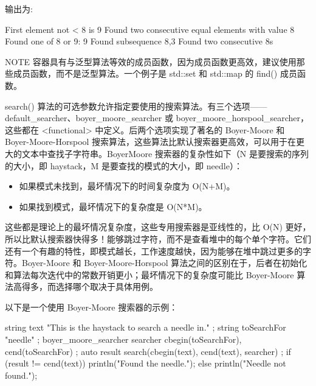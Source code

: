 输出为:

\begin{shell}
First element not < 8 is 9
Found two consecutive equal elements with value 8
Found one of 8 or 9: 9
Found subsequence {8,3}
Found two consecutive 8s
\end{shell}

\begin{myNotic}{NOTE}
容器具有与泛型算法等效的成员函数，因为成员函数更高效，建议使用那些成员函数，而不是泛型算法。一个例子是 std::set 和 std::map 的 find() 成员函数。
\end{myNotic}


search() 算法的可选参数允许指定要使用的搜索算法。有三个选项——default\_searcher、boyer\_moore\_searcher 或 boyer\_moore\_horspool\_searcher，这些都在 <functional> 中定义。后两个选项实现了著名的 Boyer-Moore 和 Boyer-Moore-Horspool 搜索算法，这些算法比默认搜索器更高效，可以用于在更大的文本中查找子字符串。BoyerMoore 搜索器的复杂性如下（N 是要搜索的序列的大小，即 haystack，M 是要查找的模式的大小，即 needle）：

\begin{itemize}
\item
如果模式未找到，最坏情况下的时间复杂度为 O(N+M)。

\item
如果找到模式，最坏情况下的复杂度是 O(N*M)。
\end{itemize}

这些都是理论上的最坏情况复杂度，这些专用搜索器是亚线性的，比 O(N) 更好，所以比默认搜索器快得多！能够跳过字符，而不是查看堆中的每个单个字符。它们还有一个有趣的特性，即模式越长，工作速度越快，因为能够在堆中跳过更多的字符。Boyer-Moore 和 Boyer-Moore-Horspool 算法之间的区别在于，后者在初始化和算法每次迭代中的常数开销更小；最坏情况下的复杂度可能比 Boyer-Moore 算法高得多，而选择哪个取决于具体用例。

以下是一个使用 Boyer-Moore 搜索器的示例：

\begin{cpp}
string text { "This is the haystack to search a needle in." };
string toSearchFor { "needle" };
boyer_moore_searcher searcher { cbegin(toSearchFor), cend(toSearchFor) };
auto result { search(cbegin(text), cend(text), searcher) };
if (result != cend(text)) {
    println("Found the needle.");
} else {
    println("Needle not found.");
}
\end{cpp}


